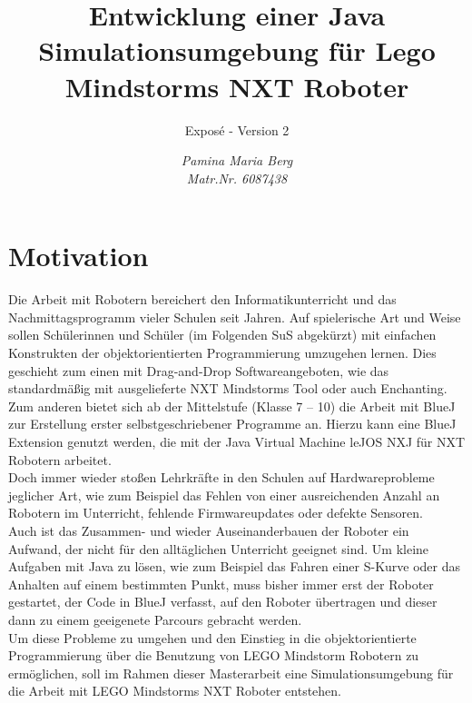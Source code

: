 \documentclass[paper=a4, pagesize, DIV=calc, BCOR=12.5mm, twoside=on, onecolumn=on, open = any, titlepage =on, parskip =half-, headsepline = on, footsepline = on, chapterprefix = on, appendixprefix = off, fontsize = 12pt, numbers = noenddot, abstract = on]{scrbook}
\numberwithin{equation}{chapter}
\begin{document}
\thispagestyle{plain}


\title{Entwicklung einer Java Simulationsumgebung für Lego Mindstorms NXT Roboter}
\subtitle{Exposé - Version 2}
\author{\emph{Pamina Maria Berg}\\
\emph{Matr.Nr. 6087438}}

\maketitle

\par \singlespacing
\section*{Motivation}
\onehalfspacing
Die Arbeit mit Robotern bereichert den Informatikunterricht und das Nachmittagsprogramm vieler Schulen seit Jahren. Auf spielerische Art und Weise sollen Schülerinnen und Schüler (im Folgenden SuS abgekürzt) mit einfachen Konstrukten der objektorientierten Programmierung umzugehen lernen. Dies geschieht zum einen mit Drag-and-Drop Softwareangeboten, wie das standardmäßig mit ausgelieferte NXT Mindstorms Tool oder auch Enchanting. Zum anderen bietet sich ab der Mittelstufe (Klasse 7 -- 10) die Arbeit mit BlueJ zur Erstellung erster selbstgeschriebener Programme an. Hierzu kann eine BlueJ Extension genutzt werden, die mit der Java Virtual Machine leJOS NXJ für NXT Robotern arbeitet.\\
Doch immer wieder stoßen Lehrkräfte in den Schulen auf Hardwareprobleme jeglicher Art, wie zum Beispiel das Fehlen von einer ausreichenden Anzahl an Robotern im Unterricht, fehlende Firmwareupdates oder defekte Sensoren.\\
Auch ist das Zusammen- und wieder Auseinanderbauen der Roboter ein Aufwand, der nicht für den alltäglichen Unterricht geeignet sind. Um kleine Aufgaben mit Java zu lösen, wie zum Beispiel das Fahren einer S-Kurve oder das Anhalten auf einem bestimmten Punkt, muss bisher immer erst der Roboter gestartet, der Code in BlueJ verfasst, auf den Roboter übertragen und dieser dann zu einem geeigenete Parcours gebracht werden.\\
Um diese Probleme zu umgehen und den Einstieg in die objektorientierte Programmierung über die Benutzung von LEGO Mindstorm Robotern zu ermöglichen, soll im Rahmen dieser Masterarbeit eine Simulationsumgebung für die Arbeit mit LEGO Mindstorms NXT Roboter entstehen.
\end{document}
